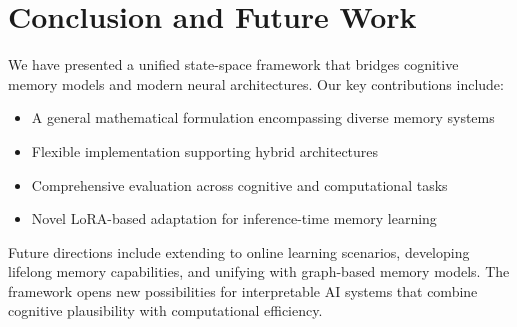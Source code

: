 \section{Conclusion and Future Work}
We have presented a unified state-space framework that bridges cognitive memory models and modern neural architectures. Our key contributions include:

\begin{itemize}
\item A general mathematical formulation encompassing diverse memory systems
\item Flexible implementation supporting hybrid architectures
\item Comprehensive evaluation across cognitive and computational tasks
\item Novel LoRA-based adaptation for inference-time memory learning
\end{itemize}

Future directions include extending to online learning scenarios, developing lifelong memory capabilities, and unifying with graph-based memory models. The framework opens new possibilities for interpretable AI systems that combine cognitive plausibility with computational efficiency.
